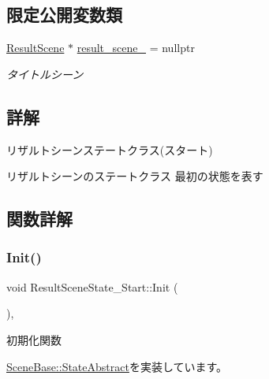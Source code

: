 \subsection*{限定公開変数類}
\begin{DoxyCompactItemize}
\item 
\mbox{\hyperlink{class_result_scene}{Result\+Scene}} $\ast$ \mbox{\hyperlink{class_result_scene_state___start_a223a52e93231e460dad3401a1a49931d}{result\+\_\+scene\+\_\+}} = nullptr
\begin{DoxyCompactList}\small\item\em タイトルシーン \end{DoxyCompactList}\end{DoxyCompactItemize}


\subsection{詳解}
リザルトシーンステートクラス(スタート) 

リザルトシーンのステートクラス 最初の状態を表す 

\subsection{関数詳解}
\mbox{\label{class_result_scene_state___start_a615c7e05efd2320b8956c5fd94398f55}} 
\subsubsection{\texorpdfstring{Init()}{Init()}}
{\footnotesize\ttfamily void Result\+Scene\+State\+\_\+\+Start\+::\+Init (\begin{DoxyParamCaption}{ }\end{DoxyParamCaption})\hspace{0.3cm}{\ttfamily [override]}, {\ttfamily [virtual]}}



初期化関数 



\mbox{\hyperlink{class_scene_base_1_1_state_abstract_a2f5ea12e789aa52df179e6df469b870d}{Scene\+Base\+::\+State\+Abstract}}を実装しています。

\mbox{\label{class_result_scene_state___start_a8f776a7b2d31451c434fb74ffdd65960}} 
